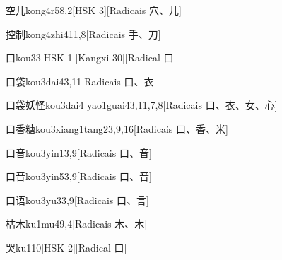 \begin{entry}{空儿}{kong4r5}{8,2}[HSK 3][Radicais ⽳、⼉]
\end{entry}

\begin{entry}{控制}{kong4zhi4}{11,8}[Radicais ⼿、⼑]
\end{entry}

\begin{entry}{口}{kou3}{3}[HSK 1][Kangxi 30][Radical ⼝]
\end{entry}

\begin{entry}{口袋}{kou3dai4}{3,11}[Radicais ⼝、⾐]
\end{entry}

\begin{entry}{口袋妖怪}{kou3dai4 yao1guai4}{3,11,7,8}[Radicais ⼝、⾐、⼥、⼼]
\end{entry}

\begin{entry}{口香糖}{kou3xiang1tang2}{3,9,16}[Radicais ⼝、⾹、⽶]
\end{entry}

\begin{entry}{口音}{kou3yin1}{3,9}[Radicais ⼝、⾳]
\end{entry}

\begin{entry}{口音}{kou3yin5}{3,9}[Radicais ⼝、⾳]
\end{entry}

\begin{entry}{口语}{kou3yu3}{3,9}[Radicais ⼝、⾔]
\end{entry}

\begin{entry}{枯木}{ku1mu4}{9,4}[Radicais ⽊、⽊]
\end{entry}

\begin{entry}{哭}{ku1}{10}[HSK 2][Radical ⼝]
\end{entry}

